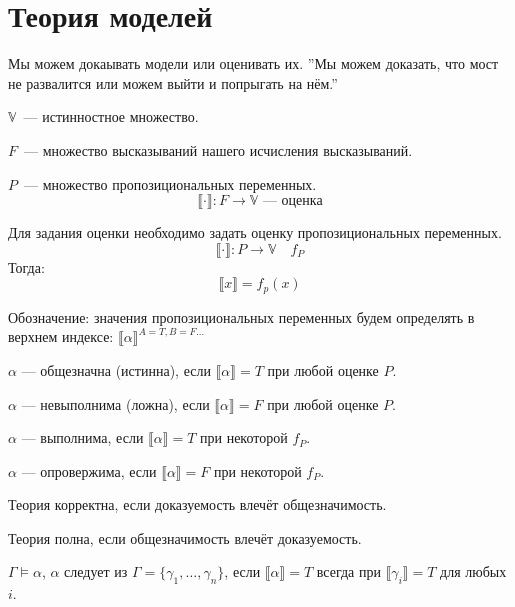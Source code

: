 \section{Теория моделей}
Мы можем докаывать модели или оценивать их.
''Мы можем доказать, что мост не развалится или можем выйти и попрыгать на нём.''

\begin{definition}
    $\mathbb{V}$~--- истинностное множество.

    $F$~--- множество высказываний нашего исчисления высказываний.

    $P$~--- множество пропозициональных переменных.
    \[ \llbracket\cdot\rrbracket: F \to \mathbb{V} \text{~--- оценка}\]
\end{definition}

\begin{definition}
    Для задания оценки необходимо задать оценку пропозициональных переменных.
    \[\llbracket \cdot \rrbracket : P\to \mathbb{V} \quad f_P\]
    Тогда: 
    \[ \llbracket x \rrbracket = f_p(x)\]
\end{definition}

\begin{remark}
    Обозначение: значения пропозициональных переменных будем определять в верхнем индексе: $\llbracket \alpha \rrbracket ^{A = T, B = F \ldots}$
\end{remark}

\begin{definition}
    $\alpha$ --- общезначна (истинна), если $\llbracket \alpha \rrbracket = T$ при любой оценке $P$.

    $\alpha$ --- невыполнима (ложна), если $\llbracket \alpha \rrbracket = F$ при любой оценке $P$.
    
    $\alpha$ --- выполнима, если $\llbracket \alpha \rrbracket = T$ при некоторой $f_P$.

    $\alpha$ --- опровержима, если $\llbracket \alpha \rrbracket = F$ при некоторой $f_P$.
\end{definition}

\begin{definition}
    Теория корректна, если доказуемость влечёт общезначимость.

    Теория полна, если общезначимость влечёт доказуемость.
\end{definition}

\begin{definition}
    $\Gamma \vDash \alpha$, $\alpha$ следует из $\Gamma = \{ \gamma_1, \ldots, \gamma_n\}$, 
    если $\llbracket \alpha \rrbracket = T$ всегда при $\llbracket \gamma_i \rrbracket = T$ для любых $i$.  
\end{definition}

